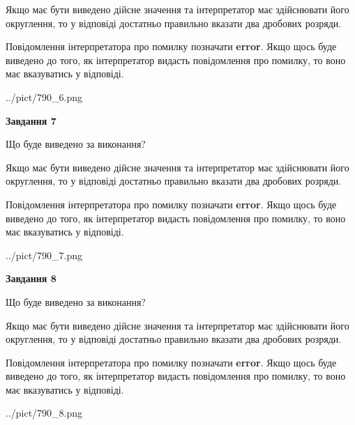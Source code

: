 \documentclass[12pt, ukrainian]{article}
\begin{document}
{\begin {Large}
Якщо має бути виведено дійсне значення та інтерпретатор має здійснювати його округлення, 
то у відповіді достатньо правильно вказати два дробових розряди.

Повідомлення інтерпретатора про помилку позначати \textbf{error}.
Якщо щось буде виведено до того, як інтерпретатор видасть повідомлення про помилку, 
то воно має вказуватись у відповіді. \par

\begin{center}
	{../pict/790_6.png}
\end{center}
\newpage

{\begin {center}\textbf{Завдання 7}\end {center}}\par
Що буде виведено за виконання? \par

Якщо має бути виведено дійсне значення та інтерпретатор має здійснювати його округлення, 
то у відповіді достатньо правильно вказати два дробових розряди.

Повідомлення інтерпретатора про помилку позначати \textbf{error}.
Якщо щось буде виведено до того, як інтерпретатор видасть повідомлення про помилку, 
то воно має вказуватись у відповіді. \par

\begin{center}
	{../pict/790_7.png}
\end{center}
\newpage

{\begin {center}\textbf{Завдання 8}\end {center}}\par
Що буде виведено за виконання? \par

Якщо має бути виведено дійсне значення та інтерпретатор має здійснювати його округлення, 
то у відповіді достатньо правильно вказати два дробових розряди.

Повідомлення інтерпретатора про помилку позначати \textbf{error}.
Якщо щось буде виведено до того, як інтерпретатор видасть повідомлення про помилку, 
то воно має вказуватись у відповіді. \par

\begin{center}
	{../pict/790_8.png}
\end{center}
\newpage


\end{Large}}
\end{document}
